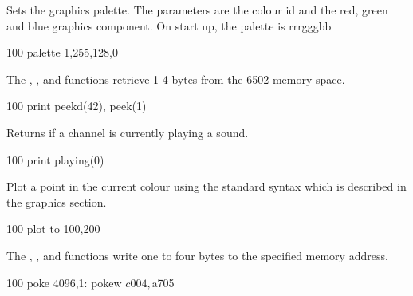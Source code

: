 \begin{entry}
Sets the graphics palette. The parameters are the colour id and the red, green and blue graphics component. On start up, the palette is rrrgggbb

\begin{lstexample}
100 palette 1,255,128,0
\end{lstexample}
\end{entry}

\begin{entry}
The , ,  and  functions retrieve 1-4 bytes from the 6502 memory space.

\begin{lstexample}
100 print peekd(42), peek(1)
\end{lstexample}
\end{entry}

\begin{entry}
Returns  if a channel is currently playing a sound.

\begin{lstexample}
100 print playing(0)
\end{lstexample}
\end{entry}

\begin{entry}
Plot a point in the current colour using the standard syntax which is described in the graphics section.

\begin{lstexample}
100 plot to 100,200
\end{lstexample}
\end{entry}

\begin{entry}
The , ,  and  functions write one to four bytes to the specified memory address.

\begin{lstexample}
100 poke 4096,1: pokew $c004,$a705
\end{lstexample}
\end{entry}

